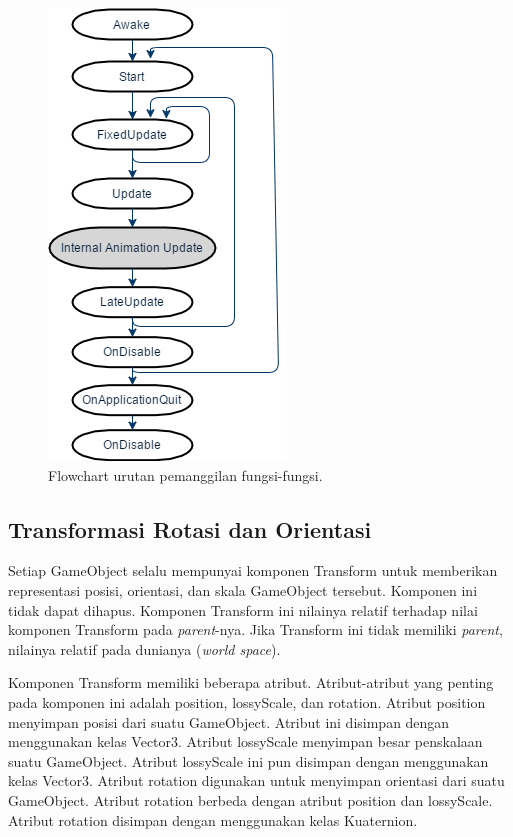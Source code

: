 \begin{itemize}
    \begin{figure}[htbp]
    \centering
    \includegraphics[scale=0.6]{Gambar/unity-script-flowchart.png}
    \caption{Flowchart urutan pemanggilan fungsi-fungsi.} 
    \label{fig:flowchart_pemanggilan_fungsi}
    \end{figure}
    
\end{itemize}
 
 
\subsection{Transformasi Rotasi dan Orientasi}
\label{ssec:transformasi_rotasi_dan_orientasi}

 Setiap GameObject selalu mempunyai komponen Transform untuk memberikan representasi posisi, orientasi, dan skala GameObject tersebut. Komponen ini tidak dapat dihapus. Komponen Transform ini nilainya relatif terhadap nilai komponen Transform pada \textit{parent}-nya. Jika Transform ini tidak memiliki \textit{parent}, nilainya relatif pada dunianya (\textit{world space}). 
 
 Komponen Transform memiliki beberapa atribut. Atribut-atribut yang penting pada komponen ini adalah position, lossyScale, dan rotation. Atribut position menyimpan posisi dari suatu GameObject. Atribut ini disimpan dengan menggunakan kelas Vector3. Atribut lossyScale menyimpan besar penskalaan suatu GameObject. Atribut lossyScale ini pun disimpan dengan menggunakan kelas Vector3. Atribut rotation digunakan untuk menyimpan orientasi dari suatu GameObject. Atribut rotation berbeda dengan atribut position dan lossyScale. Atribut rotation disimpan dengan menggunakan kelas Kuaternion. 
 
